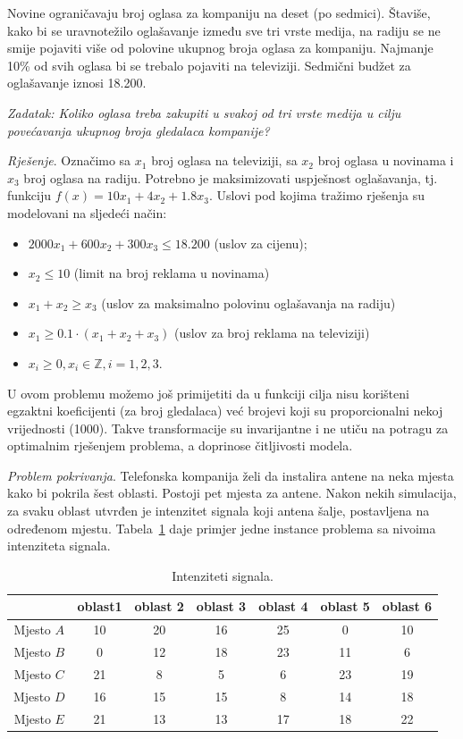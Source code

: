 \documentclass[a4paper, utf8, 11pt, colorlinks]{book}
\begin{document}
Novine ograničavaju broj oglasa za kompaniju na deset (po sedmici). Štaviše, kako bi se uravnotežilo oglašavanje između sve tri vrste medija, na radiju se ne smije pojaviti više od polovine ukupnog broja oglasa za kompaniju. Najmanje 10\% od svih oglasa bi se trebalo pojaviti na televiziji. Sedmični budžet za oglašavanje iznosi 18.200. 

\emph{Zadatak: Koliko oglasa treba zakupiti u svakoj od tri vrste medija u cilju povećavanja ukupnog broja gledalaca kompanije?}

\emph{Rješenje}.   Označimo sa $x_1$ broj oglasa na televiziji, sa $x_2$ broj oglasa u novinama i $x_3$ broj oglasa na radiju. Potrebno je maksimizovati   uspješnost oglašavanja, tj. funkciju 
$f(x) = 10 x_1 + 4 x_2 + 1.8 x_3.$ Uslovi pod kojima tražimo rješenja su modelovani na sljedeći način:
\begin{itemize}
	\item $2000 x_1 + 600 x_2 + 300 x_3 \leq 18.200$ (uslov za cijenu);
	\item  $ x_2 \leq 10$ (limit na broj reklama u novinama)
	\item $x_1 + x_2 \geq x_3$ (uslov za maksimalno polovinu oglašavanja na radiju) 
	\item ${x_1}\geq 0.1\cdot (x_1 + x_2 + x_3)$ (uslov za broj reklama na televiziji)
	\item $x_i \geq 0, x_i \in \mathbb{Z}, i=1,2,3$.
\end{itemize}

U ovom problemu možemo još primijetiti da u funkciji cilja   
nisu korišteni egzaktni koeficijenti (za broj gledalaca) već brojevi koji su proporcionalni nekoj vrijednosti (1000). Takve transformacije su invarijantne i ne utiču na potragu za optimalnim rješenjem  problema, a doprinose čitljivosti modela.


\emph{Problem pokrivanja}. Telefonska kompanija želi da instalira antene na neka mjesta kako bi pokrila šest oblasti. Postoji pet mjesta za antene. Nakon nekih simulacija, za svaku oblast utvrđen je intenzitet signala koji antena šalje, postavljena na određenom mjestu. Tabela~\ref{tab:tb-3} daje   primjer jedne instance problema sa nivoima intenziteta signala.

\begin{table}[!ht]
	\centering
	\begin{tabular}{c|cccccc} \hline
		\              & oblast1 & oblast 2 & oblast 3 & oblast 4 & oblast 5 & oblast 6 \\ \hline
		Mjesto $A$     & 10  & 20 & 16 & 25 & 0   & 10   \\
		Mjesto $B$     & 0   & 12 & 18 &  23 & 11 & 6   \\
		Mjesto $C$     & 21  &  8 & 5  &  6 & 23  &  19 \\
		Mjesto $D$    &  16 &  15 & 15 &  8 & 14 & 18   \\
		Mjesto $E $    &  21 & 13 & 13 & 17 & 18  & 22    \\ \hline
	\end{tabular}
	\caption{Intenziteti signala.}
	\label{tab:tb-3}
\end{table}
\end{document}
